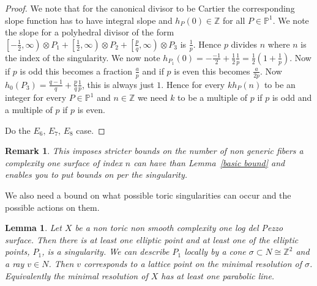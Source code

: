 \documentclass[12pt,a4paper]{book}      %
\newtheorem{lem}[thm]{Lemma}
\newtheorem*{rem}{Remark}
\newcommand{\mb}[1]{\mathbb{#1}}
\begin{document}
\begin{proof}
We note that for the canonical divisor to be Cartier the corresponding slope function has to have integral slope and $h_P(0) \in \mathbb{Z}$ for all $P \in \mb{P}^1$. We note the slope for a polyhedral divisor of the form $\left[-\frac{1}{2}, \infty \right) \otimes P_1 + \left[ \frac{1}{2}, \infty \right) \otimes P_2 + \left[ \frac{p}{q}, \infty \right) \otimes P_3$ is $\frac{1}{p}$. Hence $p$ divides $n$ where $n$ is the index of the singularity. We now note $h_{P_1} (0) = -\frac{-1}{2} + \frac{1}{2} \frac{1}{p} = \frac{1}{2} (1 + \frac{1}{p})$. Now if $p$ is odd this becomes a fraction $\frac{a}{p}$ and if $p$ is even this becomes $\frac{a}{2p}$. Now $h_0(P_3) = \frac{q-1}{q} + \frac{p}{q} \frac{1}{p}$, this is always just $1$. Hence for every $k h_P(n)$ to be an integer for every $P \in \mb{P}^1$ and $n \in \mb{Z}$ we need $k$ to be a multiple of $p$ if $p$ is odd and a multiple of $p$ if $p$ is even.


Do the $E_6, \, E_7,\, E_8$ case.
\end{proof}

\begin{rem}
This imposes stricter bounds on the number of non generic fibers a complexity one surface of index $n$ can have than Lemma~\ref{basic bound} and enables you to put bounds on per the singularity. 
\end{rem}

We also need a bound on what possible toric singularities can occur and the possible actions on them.

\begin{lem}{\label{Structure}}
Let $X$ be a non toric non smooth complexity one log del Pezzo surface. Then there is at least one elliptic point and at least one of the elliptic points, $P_1$, is a singularity.  We can describe $P_1$ locally by a cone $\sigma \subset N \cong \mb{Z}^2$ and a ray $v \in N$. Then $v$ corresponds to a lattice point on the minimal resolution of $\sigma$. Equivalently the minimal resolution of $X$ has at least one parabolic line.
\end{lem}
\end{document}
